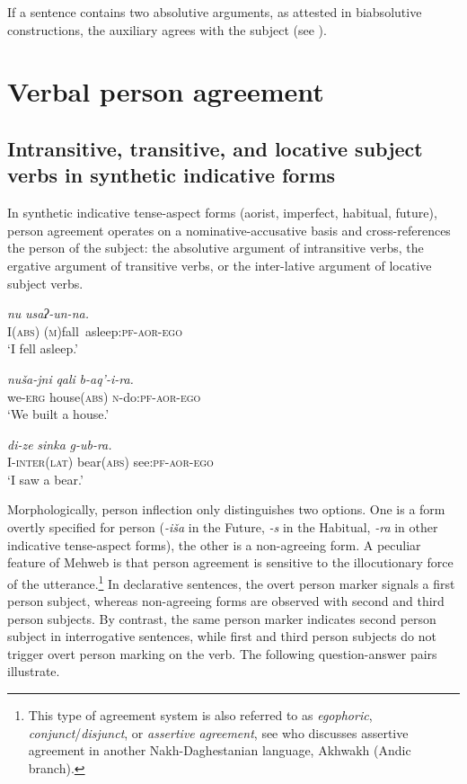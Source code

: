 ﻿\documentclass[output=paper]{langsci/langscibook}
\begin{document}
If a sentence contains two absolutive arguments, as attested in
biabsolutive constructions, the auxiliary agrees with the subject (see
).


\section{Verbal person agreement}\label{Verbal-person-agreement}

\subsection{Intransitive, transitive, and locative subject verbs in synthetic indicative forms}\label{intransitive-transitive-and-locative-subject-verbs-in-synthetic-indicative-forms}

In synthetic indicative tense-aspect forms (aorist, imperfect, habitual,
future), person agreement operates on a nominative-accusative basis and
cross-references the person of the subject: the absolutive argument of
intransitive verbs, the ergative argument of transitive verbs, or the
inter-lative argument of locative subject verbs.

\ea %
\gll \emph{nu} \emph{usaʔ-un-na.}\\
I(\textsc{abs}) (\textsc{m})fall~asleep:\textsc{pf}-\textsc{aor}-\textsc{ego}\\
\glt `I fell asleep.'

\ex %
\gll \emph{nuša-jni} \emph{qali} \emph{b-aq'-i-ra.}\\
we-\textsc{erg} house(\textsc{abs}) \textsc{n}-do:\textsc{pf}-\textsc{aor}-\textsc{ego}\\
\glt `We built a house.'

\ex %
\gll \emph{di-ze} \emph{sinka} \emph{g-ub-ra.}\\
I-\textsc{inter(lat)} bear(\textsc{abs}) see:\textsc{pf}-\textsc{aor}-\textsc{ego}\\
\glt `I saw a bear.'
\z

Morphologically, person inflection only distinguishes two options. One
is a form overtly specified for person (\emph{-iša} in the Future,
\emph{-s} in the Habitual, \emph{-ra} in other indicative
tense-aspect forms), the other is a non-agreeing form. A peculiar
feature of Mehweb is that person agreement is sensitive to the
illocutionary force of the utterance.\footnote{This type of agreement
  system is also referred to as \emph{egophoric},
  \emph{conjunct}/\emph{disjunct}, or \emph{assertive} \emph{agreement},
  see \citet{creissels2008} who discusses assertive agreement in another
  Nakh-Daghestanian language, Akhwakh (Andic branch).} In declarative
sentences, the overt person
marker signals a first person subject,
whereas non-agreeing forms are observed with second and third
person subjects. By contrast, the same person marker indicates second
person subject in interrogative sentences, while first and third person
subjects do not trigger overt person marking on the verb. The following
question-answer pairs illustrate.
\end{document}
